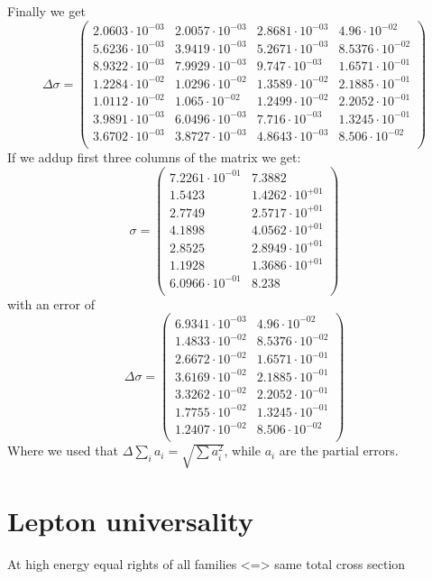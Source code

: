 \documentclass[]{article}
\begin{document}
Finally we get
\begin{equation}
\Delta\sigma=\begin{pmatrix}
   2.0603\cdot 10^{-03} & 2.0057\cdot 10^{-03} & 2.8681\cdot 10^{-03} & 4.96\cdot 10^{-02} \\
   5.6236\cdot 10^{-03} & 3.9419\cdot 10^{-03} & 5.2671\cdot 10^{-03} & 8.5376\cdot 10^{-02} \\
   8.9322\cdot 10^{-03} & 7.9929\cdot 10^{-03} & 9.747\cdot 10^{-03} & 1.6571\cdot 10^{-01} \\
   1.2284\cdot 10^{-02} & 1.0296\cdot 10^{-02} & 1.3589\cdot 10^{-02} & 2.1885\cdot 10^{-01} \\
   1.0112\cdot 10^{-02} & 1.065\cdot 10^{-02} & 1.2499\cdot 10^{-02} & 2.2052\cdot 10^{-01} \\
   3.9891\cdot 10^{-03} & 6.0496\cdot 10^{-03} & 7.716\cdot 10^{-03} & 1.3245\cdot 10^{-01} \\
   3.6702\cdot 10^{-03} & 3.8727\cdot 10^{-03} & 4.8643\cdot 10^{-03} & 8.506\cdot 10^{-02} \\
\end{pmatrix}
\end{equation}
If we addup first three columns of the matrix we get:
\begin{equation}
\sigma=
\begin{pmatrix}
   7.2261\cdot 10^{-01} & 7.3882 \\
   1.5423 & 1.4262\cdot 10^{+01} \\
   2.7749 & 2.5717\cdot 10^{+01} \\
   4.1898 & 4.0562\cdot 10^{+01} \\
   2.8525 & 2.8949\cdot 10^{+01} \\
   1.1928 & 1.3686\cdot 10^{+01} \\
   6.0966\cdot 10^{-01} & 8.238 \\
\end{pmatrix}
\end{equation}
with an error of
\begin{equation}
\Delta\sigma=
\begin{pmatrix}
   6.9341\cdot 10^{-03} & 4.96\cdot 10^{-02} \\
   1.4833\cdot 10^{-02} & 8.5376\cdot 10^{-02} \\
   2.6672\cdot 10^{-02} & 1.6571\cdot 10^{-01} \\
   3.6169\cdot 10^{-02} & 2.1885\cdot 10^{-01} \\
   3.3262\cdot 10^{-02} & 2.2052\cdot 10^{-01} \\
   1.7755\cdot 10^{-02} & 1.3245\cdot 10^{-01} \\
   1.2407\cdot 10^{-02} & 8.506\cdot 10^{-02} \\
\end{pmatrix}
\end{equation}
Where we used that $\Delta\sum_i a_i=\sqrt{\sum a_i^2}$, while $a_i$ are the partial errors.


\section{Lepton universality}
At high energy equal rights of all families <=> same total cross section

\pagebreak
\nocite{*}
\printbibliography
\end{document}
